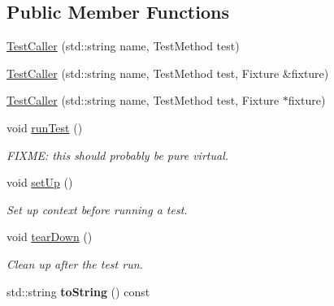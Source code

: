 \subsection*{Public Member Functions}
\begin{DoxyCompactItemize}
\item 
\hyperlink{class_test_caller_a84cb35144455c4245c45d755b84c6093}{Test\-Caller} (std\-::string name, Test\-Method test)
\item 
\hyperlink{class_test_caller_a21479de59b7c38a6d8bed9e66025ebb0}{Test\-Caller} (std\-::string name, Test\-Method test, Fixture \&fixture)
\item 
\hyperlink{class_test_caller_a5977f4de9736929451f30b039a42487d}{Test\-Caller} (std\-::string name, Test\-Method test, Fixture $\ast$fixture)
\item 
\hypertarget{class_test_caller_aad0c877a47b75d056a4f8f323d3169ab}{void \hyperlink{class_test_caller_aad0c877a47b75d056a4f8f323d3169ab}{run\-Test} ()}\label{class_test_caller_aad0c877a47b75d056a4f8f323d3169ab}

\begin{DoxyCompactList}\small\item\em F\-I\-X\-M\-E\-: this should probably be pure virtual. \end{DoxyCompactList}\item 
\hypertarget{class_test_caller_ae6880afc711d24ae0b8846759064ceea}{void \hyperlink{class_test_caller_ae6880afc711d24ae0b8846759064ceea}{set\-Up} ()}\label{class_test_caller_ae6880afc711d24ae0b8846759064ceea}

\begin{DoxyCompactList}\small\item\em Set up context before running a test. \end{DoxyCompactList}\item 
\hypertarget{class_test_caller_a0e463b88bf0ceacbd8875e0450ed2649}{void \hyperlink{class_test_caller_a0e463b88bf0ceacbd8875e0450ed2649}{tear\-Down} ()}\label{class_test_caller_a0e463b88bf0ceacbd8875e0450ed2649}

\begin{DoxyCompactList}\small\item\em Clean up after the test run. \end{DoxyCompactList}\item 
\hypertarget{class_test_caller_a55f4f93fc657acb8c1dd500923a4bd1f}{std\-::string {\bfseries to\-String} () const }\label{class_test_caller_a55f4f93fc657acb8c1dd500923a4bd1f}

\end{DoxyCompactItemize}
